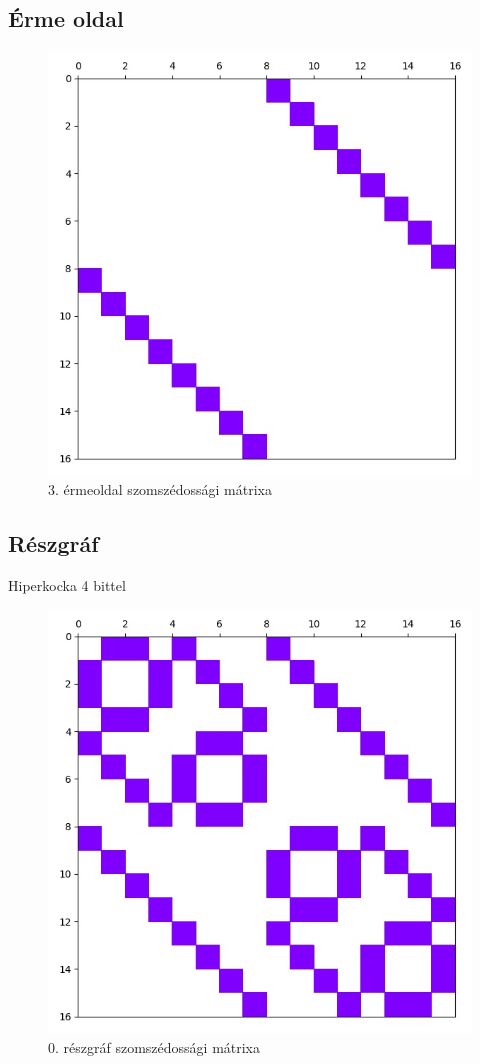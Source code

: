 \documentclass[14pt,a4paper]{article}
\begin{document}
\subsection{Érme oldal}
\begin{figure}[H]
\centering
\includegraphics[width = 0.7\columnwidth]{coin_faces/coin_face_03.jpg}
\caption{3. érmeoldal szomszédossági mátrixa}
\end{figure}
\subsection{Részgráf}
Hiperkocka 4 bittel
\begin{figure}[H]
\centering
\includegraphics[width = 0.7\columnwidth]{graph/sub_graph_00.jpg}
\caption{0. részgráf szomszédossági mátrixa}
\end{figure}
\end{document}
